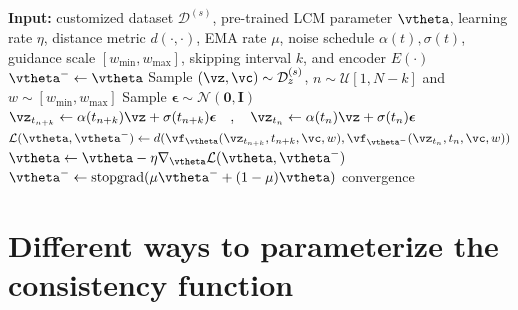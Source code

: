 \documentclass{article} %
\begin{document}
\begin{algorithm}[H]
    \begin{minipage}{\linewidth}
        \caption{Latent Consistency Fine-tuning (LCF)}\label{alg:LCF}
        \begin{algorithmic}
            \STATE \textbf{Input:} customized dataset $\mathcal{D}^{(s)}$, pre-trained LCM parameter $\vtheta$, learning rate $\eta$, distance metric $d(\cdot,\cdot)$, EMA rate $\mu$, noise schedule $\alpha(t),\sigma(t)$, {guidance scale $[w_{\text{min}},w_{\text{max}}]$, skipping interval $k$, and encoder $E(\cdot)$}
            \STATE $\vtheta^-\leftarrow\vtheta$
            \REPEAT
            \STATE Sample $(\vz,\vc) \sim \mathcal{D}^{(s)}_z$, {$n\sim \mathcal{U}[1,N-k]$ and $w\sim [w_\text{min},w_\text{max}]$}
            \STATE Sample $\boldsymbol{\epsilon} \sim \mathcal{N}\left(\mathbf{0}, \boldsymbol{I}\right)$
            \STATE $\vz_{t_{n+k}} \leftarrow \alpha(t_{n+k})\vz + \sigma(t_{n+k})\boldsymbol{\epsilon}\quad,\quad \vz_{t_{n}}\leftarrow \alpha(t_{n})\vz + \sigma(t_{n})\boldsymbol{\epsilon}$
            \STATE $\begin{aligned}\mathcal{L}(\vtheta,\vtheta^-)\leftarrow {d(\vf_\vtheta(\vz_{t_{n+k}},t_{n+k},\vc,w),\vf_{\vtheta^-}({\vz}_{t_n},t_n,\vc,w))}\end{aligned}$
          \STATE $\vtheta\leftarrow\vtheta-\eta\nabla_\vtheta\mathcal{L}(\vtheta,\vtheta^-)$
            \STATE $\vtheta^-\leftarrow \text{stopgrad}(\mu\vtheta^-+(1-\mu)\vtheta)$
            \UNTIL convergence
        \end{algorithmic} 
    \end{minipage}
\end{algorithm}



\section{Different ways to parameterize the consistency function\label{appendix:parameterization}}
\end{document}
